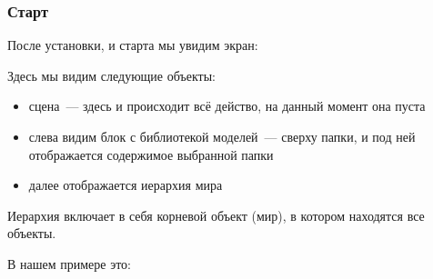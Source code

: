 \label{habr57tut}

\subsubsection{Старт}

После установки, и старта мы увидим экран:


Здесь мы видим следующие объекты:

\begin{itemize}[nosep]
	\item сцена\ --- здесь и происходит всё действо, на данный момент она 
		пуста
	\item слева видим блок с библиотекой моделей\ --- сверху папки, и под 
		ней отображается содержимое выбранной папки
\item далее отображается иерархия мира
\end{itemize}

Иерархия включает в себя корневой объект (мир), в котором находятся все объекты.

В нашем примере это:

